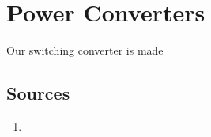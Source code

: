 \chapter{Power Converters}

Our switching converter is made

\section{Sources}
\begin{enumerate}
    \item 
\end{enumerate}